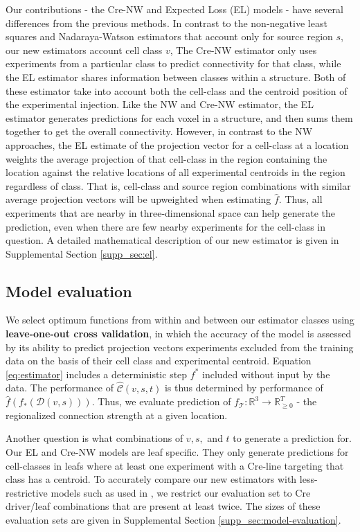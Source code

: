 Our contributions - the Cre-NW and Expected Loss (EL) models - have several differences from the previous methods.
In contrast to the non-negative least squares \citep{Oh2014-kh} and Nadaraya-Watson  \citep{Knox2019-ot} estimators that account only for source region $s$, our new estimators account cell class $v$, 
The Cre-NW estimator only uses experiments from a particular class to predict connectivity for that class, while the EL estimator shares information between classes within a structure.
Both of these estimator take into account both the cell-class and the centroid position of the experimental injection.
Like the NW and Cre-NW estimator, the EL estimator generates predictions for each voxel in a structure, and then sums them together to get the overall connectivity.
However, in contrast to the NW approaches, the EL estimate of the projection vector for a cell-class at a location weights the average projection of that cell-class in the region containing the location against the relative locations of all experimental centroids in the region regardless of class.
That is, cell-class and source region combinations with similar average projection vectors will be upweighted when estimating $\widehat f$.
Thus, all experiments that are nearby in three-dimensional space can help generate the prediction, even when there are few nearby experiments for the cell-class in question.
A detailed mathematical description of our new estimator is given in Supplemental Section \ref{supp_sec:el}.

\newpage

\subsection{Model evaluation}

We select optimum functions from within and between our estimator classes using \textbf{leave-one-out cross validation}, in which the accuracy of the model is assessed by its ability to predict projection vectors experiments excluded from the training data on the basis of their cell class and experimental centroid.
Equation \ref{eq:estimator} includes a deterministic step $f^*$ included without input by the data.
The performance of $\widehat {\mathcal C} (v,s,t)$ is thus determined by performance of $\widehat f (f_*(\mathcal D(v,s)))$.
Thus, we evaluate prediction of $f_{\mathcal T}: \mathbb R^3 \to \mathbb R_{\geq 0}^T$ - the regionalized connection strength at a given location.

Another question is what combinations of $v, s, $ and $t$ to generate a prediction for.
Our EL and Cre-NW models are leaf specific.
They only generate predictions for cell-classes in leafs where at least one experiment with a Cre-line targeting that class has a centroid.
To accurately compare our new estimators with less-restrictive models such as used in \citet{Knox2019-ot}, we restrict our evaluation set to Cre driver/leaf combinations that are present at least twice. 
The sizes of these evaluation sets are given in Supplemental Section \ref{supp_sec:model-evaluation}.

